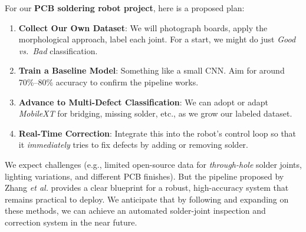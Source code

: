 \documentclass{article}
\begin{document}
For our \textbf{PCB soldering robot project}, here is a proposed plan:
\begin{enumerate}
    \item \textbf{Collect Our Own Dataset}: We will photograph boards, apply the morphological approach, label each joint. 
          For a start, we might do just \emph{Good vs.\ Bad} classification.
    \item \textbf{Train a Baseline Model}: Something like a small CNN. 
          Aim for around 70\%--80\% accuracy to confirm the pipeline works.
    \item \textbf{Advance to Multi-Defect Classification}: We can adopt or adapt \emph{MobileXT} for bridging, missing solder, etc., 
          as we grow our labeled dataset.
    \item \textbf{Real-Time Correction}: Integrate this into the robot’s control loop so that it \emph{immediately} tries to fix defects by adding or removing solder.
\end{enumerate}

We expect challenges (e.g., limited open-source data for \emph{through-hole} solder joints, lighting variations, and different PCB finishes). 
But the pipeline proposed by Zhang \emph{et al.} provides a clear blueprint for a robust, high-accuracy system that remains practical to deploy. 
We anticipate that by following and expanding on these methods, we can achieve an automated solder-joint inspection and correction system in the near future.
\end{document}
